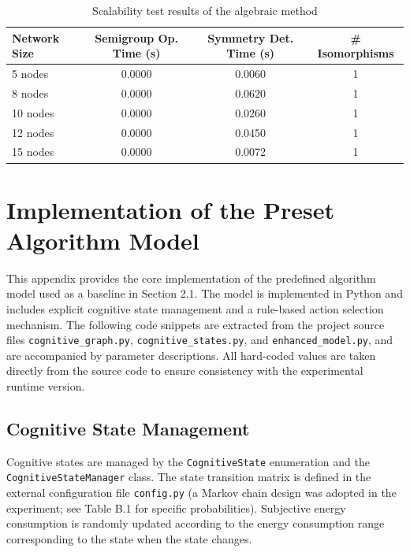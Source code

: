 \documentclass[10pt,onecolumn]{article}
\begin{document}
\begin{table}[H]
\footnotesize
\centering
\caption{Scalability test results of the algebraic method}
\label{tab:app_scalability}
\begin{tabular}{lccc}
\toprule
\textbf{Network Size} & \textbf{Semigroup Op. Time (s)} & \textbf{Symmetry Det. Time (s)} & \textbf{\# Isomorphisms} \\
\midrule
5 nodes & 0.0000 & 0.0060 & 1 \\
8 nodes & 0.0000 & 0.0620 & 1 \\
10 nodes & 0.0000 & 0.0260 & 1 \\
12 nodes & 0.0000 & 0.0450 & 1 \\
15 nodes & 0.0000 & 0.0072 & 1 \\
\bottomrule
\end{tabular}
\end{table}

\section{Implementation of the Preset Algorithm Model}
\label{app:preset_model}

This appendix provides the core implementation of the predefined algorithm model used as a baseline in Section 2.1. The model is implemented in Python and includes explicit cognitive state management and a rule-based action selection mechanism. The following code snippets are extracted from the project source files \texttt{cognitive\_graph.py}, \texttt{cognitive\_states.py}, and \texttt{enhanced\_model.py}, and are accompanied by parameter descriptions. All hard-coded values are taken directly from the source code to ensure consistency with the experimental runtime version.

\subsection{Cognitive State Management}
Cognitive states are managed by the \texttt{CognitiveState} enumeration and the \texttt{CognitiveStateManager} class. The state transition matrix is defined in the external configuration file \texttt{config.py} (a Markov chain design was adopted in the experiment; see Table B.1 for specific probabilities). Subjective energy consumption is randomly updated according to the energy consumption range corresponding to the state when the state changes.
\end{document}
